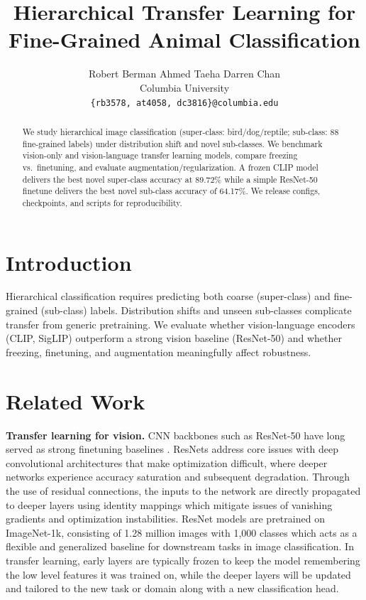 \documentclass{article}
\title{Hierarchical Transfer Learning for Fine-Grained Animal Classification}
\author{%
  Robert Berman \quad Ahmed Taeha \quad Darren Chan\\
  Columbia University\\
  \texttt{\{rb3578, at4058, dc3816\}@columbia.edu}%
}
\begin{document}
\maketitle

\begin{abstract}
We study hierarchical image classification (super-class: bird/dog/reptile; sub-class: 88 fine-grained labels) under distribution shift and novel sub-classes. We benchmark vision-only and vision-language transfer learning models, compare freezing vs.\ finetuning, and evaluate augmentation/regularization. A frozen CLIP model delivers the best novel super-class accuracy at 89.72\% while a simple ResNet-50 finetune delivers the best novel sub-class accuracy of 64.17\%. We release configs, checkpoints, and scripts for reproducibility.
\end{abstract}

\section{Introduction}
Hierarchical classification requires predicting both coarse (super-class) and fine-grained (sub-class) labels. Distribution shifts and unseen sub-classes complicate transfer from generic pretraining. We evaluate whether vision-language encoders (CLIP, SigLIP) outperform a strong vision baseline (ResNet-50) and whether freezing, finetuning, and augmentation meaningfully affect robustness.

\section{Related Work}
\textbf{Transfer learning for vision.} CNN backbones such as ResNet-50 have long served as strong finetuning baselines \citep{he2016resnet}. ResNets address core issues with deep convolutional architectures that make optimization difficult, where deeper networks experience accuracy saturation and subsequent degradation. Through the use of residual connections, the inputs to the network are directly propagated to deeper layers using identity mappings which mitigate issues of vanishing gradients and optimization instabilities. ResNet models are pretrained on ImageNet-1k, consisting of 1.28 million images with 1,000 classes which acts as a flexible and generalized baseline for downstream tasks in image classification. In transfer learning, early layers are typically frozen to keep the model remembering the low level features it was trained on, while the deeper layers will be updated and tailored to the new task or domain along with a new classification head.
\end{document}
